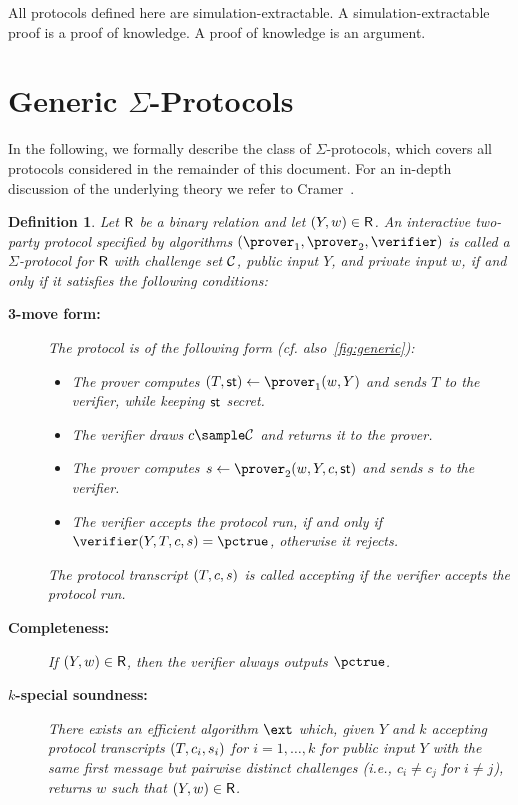 \documentclass[runningheads,11pt]{article}
\newtheorem{definition}{Definition}
\begin{document}
All protocols defined here are simulation-extractable. A simulation-extractable proof is a proof of knowledge. A proof of knowledge is an argument.

\section{Generic $\Sigma$-Protocols}


In the following, we formally describe the class of $\Sigma$-protocols, which covers all protocols considered in the remainder of this document.
 For an in-depth discussion of the underlying theory we refer to Cramer~\cite{cramer97}.
\begin{definition}\label{def:sigma}
  Let $\mathsf{R}$ be a binary relation and let $(Y,w)\in\mathsf{R}$.
  An interactive two-party protocol specified by algorithms $(\prover_1,\prover_2,\verifier)$ is called a \emph{$\Sigma$-protocol} for $\mathsf{R}$ with challenge set $\mathcal{C}$, public input $Y$, and private input $w$, if and only if it satisfies the following conditions:
  \begin{description}
    \item[\bf 3-move form:]
      The protocol is of the following form (cf. also~\cref{fig:generic}):
      \begin{itemize}
        \item
          The prover computes $(\commitment,\st) \gets \prover_1(\witness,\statement)$ and sends $T$ to the verifier, while keeping $\mathsf{st}$ secret.
        \item
          The verifier draws $c\sample\CS$ and returns it to the prover.
        \item
          The prover computes $s\gets\prover_2(\witness,\statement,\challenge,\st)$ and sends $s$ to the verifier.
        \item
          The verifier accepts the protocol run, if and only if $\verifier(Y, T,\challenge,s)=\accept$, otherwise it rejects.
      \end{itemize}
      The protocol transcript $(T,c,s)$ is called \emph{accepting} if the verifier accepts the protocol run.
    \item[\bf Completeness:]
      If $(Y,w)\in\mathsf{R}$, then the verifier always outputs $\accept$.
    \item[\bf $k$-special soundness:]
      There exists an efficient algorithm $\ext$ which, given $Y$ and $k$ accepting protocol transcripts $(T,c_i,s_i)$ for $i=1,\dots,k$ for public input $Y$ with the same first message but pairwise distinct challenges (i.e., $c_i\ne c_j$ for $i\ne j$), returns $w$ such that $(Y,w)\in\mathsf{R}$.

\end{description}
\end{definition}
\end{document}
